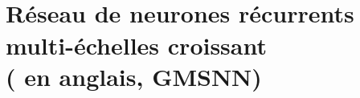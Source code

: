 \part[\Glsentrytext{project_gmsnn}]{\\{\Large Réseau de neurones récurrents multi-échelles croissant\\ ( en anglais, GMSNN)}}
\cleardoublepage
\cleardoublepage
\cleardoublepage
\cleardoublepage
\cleardoublepage
\cleardoublepage